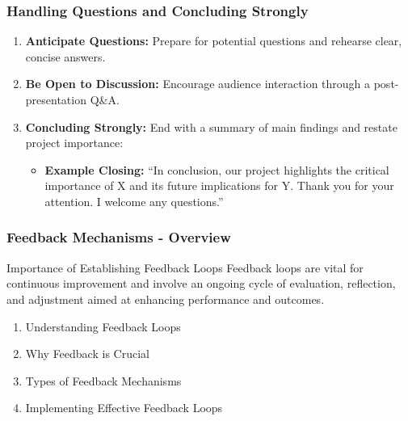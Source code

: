 \documentclass[aspectratio=169]{beamer}
\begin{document}
\begin{frame}[fragile]
    \frametitle{Handling Questions and Concluding Strongly}
    \begin{enumerate}
        \item \textbf{Anticipate Questions:} Prepare for potential questions and rehearse clear, concise answers.
        \item \textbf{Be Open to Discussion:} Encourage audience interaction through a post-presentation Q\&A.
        \item \textbf{Concluding Strongly:} End with a summary of main findings and restate project importance:
            \begin{itemize}
                \item \textbf{Example Closing:} “In conclusion, our project highlights the critical importance of X and its future implications for Y. Thank you for your attention. I welcome any questions.”
            \end{itemize}
    \end{enumerate}
\end{frame}

\begin{frame}[fragile]
    \frametitle{Feedback Mechanisms - Overview}
    
    \begin{block}{Importance of Establishing Feedback Loops}
        Feedback loops are vital for continuous improvement and involve an ongoing cycle of evaluation, reflection, and adjustment aimed at enhancing performance and outcomes.
    \end{block}

    \begin{enumerate}
        \item Understanding Feedback Loops
        \item Why Feedback is Crucial
        \item Types of Feedback Mechanisms
        \item Implementing Effective Feedback Loops
    \end{enumerate}
\end{frame}
\end{document}
